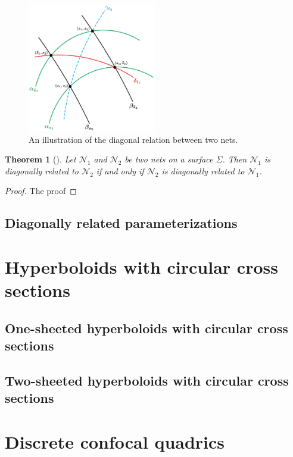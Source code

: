 \documentclass[12pt,a4paper]{article}
\newtheorem{theorem}{Theorem}[section]
\theoremstyle{definition}
\theoremstyle{remark}
\theoremstyle{definition}
\begin{document}
\begin{figure}[h]
    \centering
    \includegraphics[width=0.5\textwidth]{diagonally_related_diagram.png}
    \caption{An illustration of the diagonal relation between two nets.}
    \label{fig:diagonally-related-nets}
\end{figure}

\begin{theorem}[]
\label{thm:symmetric-definition-diagonal-nets}
Let $\mathcal{N}_1$ and $\mathcal{N}_2$ be two nets on a surface $\Sigma$. Then $\mathcal{N}_1$ is diagonally related to
$\mathcal{N}_2$ if and only if $\mathcal{N}_2$ is diagonally related to $\mathcal{N}_1$.
\end{theorem}

\begin{proof}
    The proof
\end{proof}

\subsection{Diagonally related parameterizations}
\pagebreak
\section{Hyperboloids with circular cross sections}
\subsection{One-sheeted hyperboloids with circular cross sections}
\subsection{Two-sheeted hyperboloids with circular cross sections}
\pagebreak
\section{Discrete confocal quadrics}
\pagebreak
\end{document}
